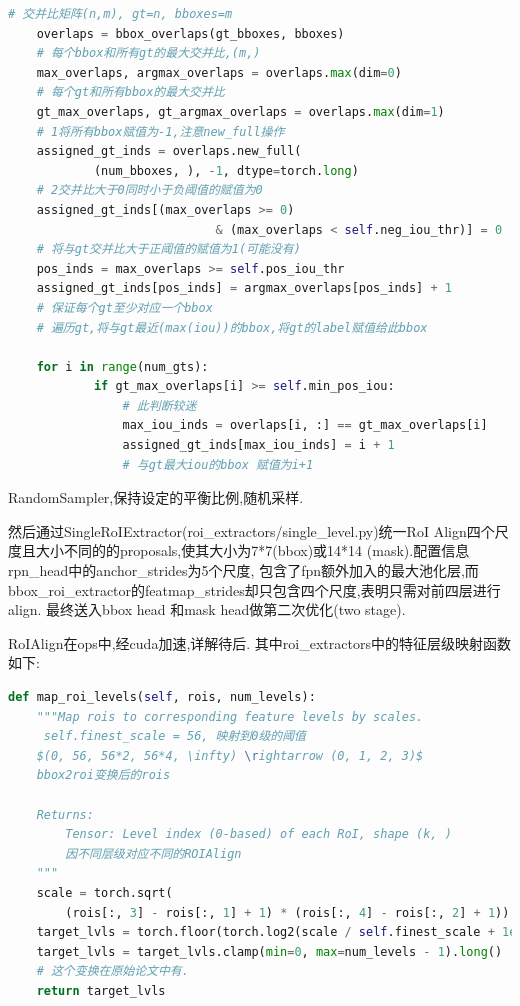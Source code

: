 \documentclass[UTF8]{ctexart}
\begin{document}
\lstset{style=mystyle}
\begin{lstlisting}[language=Python]
	# 交并比矩阵(n,m), gt=n, bboxes=m
	overlaps = bbox_overlaps(gt_bboxes, bboxes)
	# 每个bbox和所有gt的最大交并比,(m,)
	max_overlaps, argmax_overlaps = overlaps.max(dim=0)
	# 每个gt和所有bbox的最大交并比
	gt_max_overlaps, gt_argmax_overlaps = overlaps.max(dim=1)
	# 1将所有bbox赋值为-1,注意new_full操作
	assigned_gt_inds = overlaps.new_full(
			(num_bboxes, ), -1, dtype=torch.long)
	# 2交并比大于0同时小于负阈值的赋值为0
	assigned_gt_inds[(max_overlaps >= 0)
							 & (max_overlaps < self.neg_iou_thr)] = 0
	# 将与gt交并比大于正阈值的赋值为1(可能没有)
	pos_inds = max_overlaps >= self.pos_iou_thr
	assigned_gt_inds[pos_inds] = argmax_overlaps[pos_inds] + 1
	# 保证每个gt至少对应一个bbox
	# 遍历gt,将与gt最近(max(iou))的bbox,将gt的label赋值给此bbox

	for i in range(num_gts):
			if gt_max_overlaps[i] >= self.min_pos_iou:
				# 此判断较迷
				max_iou_inds = overlaps[i, :] == gt_max_overlaps[i]
				assigned_gt_inds[max_iou_inds] = i + 1 
				# 与gt最大iou的bbox 赋值为i+1

\end{lstlisting}

RandomSampler,保持设定的平衡比例,随机采样.

然后通过SingleRoIExtractor(roi\_extractors/single\_level.py)统一RoI
Align四个尺度且大小不同的的proposals,使其大小为7*7(bbox)或14*14
(mask).配置信息rpn\_head中的anchor\_strides为5个尺度,
包含了fpn额外加入的最大池化层,而bbox\_roi\_extractor的featmap\_strides却只包含四个尺度,表明只需对前四层进行align.
最终送入bbox head 和mask head做第二次优化(two stage).

RoIAlign在ops中,经cuda加速,详解待后.
其中roi\_extractors中的特征层级映射函数如下:
\lstset{style=mystyle}
\begin{lstlisting}[language=Python]
	def map_roi_levels(self, rois, num_levels):
	"""Map rois to corresponding feature levels by scales.
	 self.finest_scale = 56, 映射到0级的阈值
	$(0, 56, 56*2, 56*4, \infty) \rightarrow (0, 1, 2, 3)$
	bbox2roi变换后的rois

	Returns:
		Tensor: Level index (0-based) of each RoI, shape (k, )
		因不同层级对应不同的ROIAlign
	"""
	scale = torch.sqrt(
		(rois[:, 3] - rois[:, 1] + 1) * (rois[:, 4] - rois[:, 2] + 1))
	target_lvls = torch.floor(torch.log2(scale / self.finest_scale + 1e-6))
	target_lvls = target_lvls.clamp(min=0, max=num_levels - 1).long()
	# 这个变换在原始论文中有.
	return target_lvls
\end{lstlisting}
\end{document}
